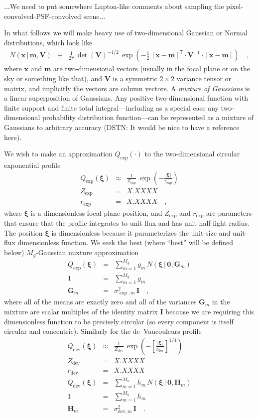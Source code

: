 \documentclass[12pt]{article}
\newcommand{\tmatrix}[1]{\boldsymbol{#1}}
\newcommand{\inverse}[1]{{#1}^{-1}}
\newcommand{\transpose}[1]{{#1}^{\mathsf T}}
\newcommand{\tvector}[1]{\boldsymbol{#1}}
\newcommand{\pos}{\tvector{x}}
\newcommand{\spos}{\tvector{\xi}}
\newcommand{\mean}{\tvector{m}}
\newcommand{\var}{\tmatrix{V}\!}
\newcommand{\Gm}{\tmatrix{G}}
\newcommand{\Hm}{\tmatrix{H}}
\newcommand{\zero}{\tmatrix{0}}
\newcommand{\identity}{\tmatrix{I}}
\newcommand{\normal}{N}
\newcommand{\given}{\,|\,}
\newcommand{\dev}{\mathrm{dev}}
\begin{document}
...We need to put somewhere Lupton-like comments about sampling the
pixel-convolved-PSF-convolved scene...

In what follows we will make heavy use of two-dimensional Gaussian or
Normal distributions, which look like
\begin{eqnarray}\displaystyle
\normal(\pos\given\mean,\var) &\equiv& \frac{1}{2\pi}\,\det(\var)^{-1/2}\,\exp(-\frac{1}{2}\,\transpose{[\pos-\mean]}\cdot\inverse{\var}\cdot[\pos-\mean])
\quad ,
\end{eqnarray}
where $\pos$ and $\mean$ are two-dimensional vectors (usually in the
focal plane or on the sky or something like that), and $\var$ is a
symmetric $2\times 2$ variance tensor or matrix, and implicitly the
vectors are column vectors.  A \emph{mixture of Gaussians} is a linear
superposition of Gaussians.  Any positive two-dimensional function
with finite support and finite total integral---including as a special
case any two-dimensional probability distribution function---can be
represented as a mixture of Gaussians to arbitrary accuracy (DSTN: It
would be nice to have a reference here).

We wish to make an approximation $Q_{\exp}(\cdot)$ to the
two-dimensional circular exponential profile
\begin{eqnarray}\displaystyle
Q_{\exp}(\spos) &\approx& \frac{1}{Z_{\exp}}\,\exp(-\frac{|\spos|}{r_{\exp}})
\\
Z_{\exp} &=& X.XXXX
\\
r_{\exp} &=& X.XXXX
\quad ,
\end{eqnarray}
where $\spos$ is a dimensionless focal-plane position, and $Z_{\exp}$
and $r_{\exp}$ are parameters that ensure that the profile integrates
to unit flux and has unit half-light radius.  The position $\spos$ is
dimensionless because it parameterizes the unit-size and unit-flux
dimensionless function.  We seek the best (where ``best'' will be
defined below) $M_g$-Gaussian mixture approximation
\begin{eqnarray}\displaystyle
Q_{\exp}(\spos) &=& \sum_{m=1}^{M_g} g_m\,\normal(\spos\given\zero,\Gm_m)
\\
1 &=& \sum_{m=1}^{M_g} g_m
\\
\Gm_m &=& \sigma^2_{\exp,m}\,\identity
\quad ,
\end{eqnarray}
where all of the means are exactly zero and all of the variances
$\Gm_m$ in the mixture are scalar multiples of the identity matrix
$\identity$ because we are requiring this dimensionless function to be
precisely circular (so every component is itself circular and
concentric).  Similarly for the de~Vaucouleurs profile
\begin{eqnarray}\displaystyle
Q_{\dev}(\spos) &\approx& \frac{1}{Z_{\dev}}\,\exp(-\left[\frac{|\spos|}{r_{\dev}}\right]^{1/4})
\\
Z_{\dev} &=& X.XXXX
\\
r_{\dev} &=& X.XXXX
\\
Q_{\dev}(\spos) &=& \sum_{m=1}^{M_h} h_m\,\normal(\spos\given\zero,\Hm_m)
\\
1 &=& \sum_{m=1}^{M_h} h_m
\\
\Hm_m &=& \sigma^2_{\dev,m}\,\identity
\quad .
\end{eqnarray}
\end{document}
